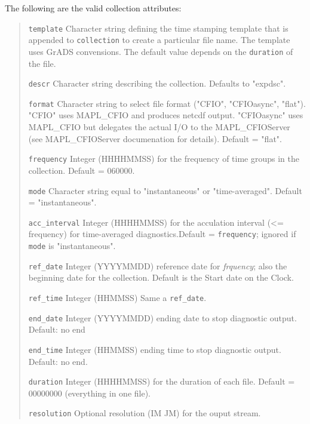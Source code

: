 The following are the valid collection attributes:
\begin{quote}
\begin{trivlist}
\item[\tt template]      Character string defining the time stamping template that is appended 
                         to {\tt collection} to create a particular file name. 
                         The template uses GrADS convensions. 
                         The default value depends on the {\tt duration} of the file.
\item[\tt descr]         Character string describing the collection. Defaults to "expdsc".
\item[\tt format]        Character string to select file format ("CFIO", "CFIOasync", "flat").  "CFIO" 
                         uses MAPL\_CFIO and produces netcdf output. "CFIOasync" uses MAPL\_CFIO but
                         delegates the actual I/O to the MAPL\_CFIOServer (see MAPL\_CFIOServer documenation for details).
                         Default = "flat".
\item[\tt frequency]     Integer (HHHHMMSS) for the frequency of time groups in the collection.
                         Default = 060000.
\item[\tt mode]          Character string equal to "instantaneous" or "time-averaged".
                         Default = "instantaneous".
\item[\tt acc\_interval] Integer (HHHHMMSS) for the acculation interval (<= frequency)
                         for time-averaged diagnostics.Default = {\tt frequency}; ignored
                         if {\tt mode} is "instantaneous".
\item[\tt ref\_date]     Integer (YYYYMMDD) reference date for {\em frquency};
                         also the beginning date for
                         the collection. Default is the Start date on the Clock.
\item[\tt ref\_time]     Integer (HHMMSS) Same a {\tt ref\_date}.
\item[\tt end\_date]     Integer (YYYYMMDD) ending date to stop diagnostic output.
                         Default: no end
\item[\tt end\_time]     Integer (HHMMSS) ending time to stop diagnostic output.
                         Default: no end.
\item[\tt duration]      Integer (HHHHMMSS) for the duration of each file. 
                         Default = 00000000 (everything in one file).
\item[\tt resolution]    Optional resolution (IM JM) for the ouput stream.

\end{trivlist}
\end{quote}
